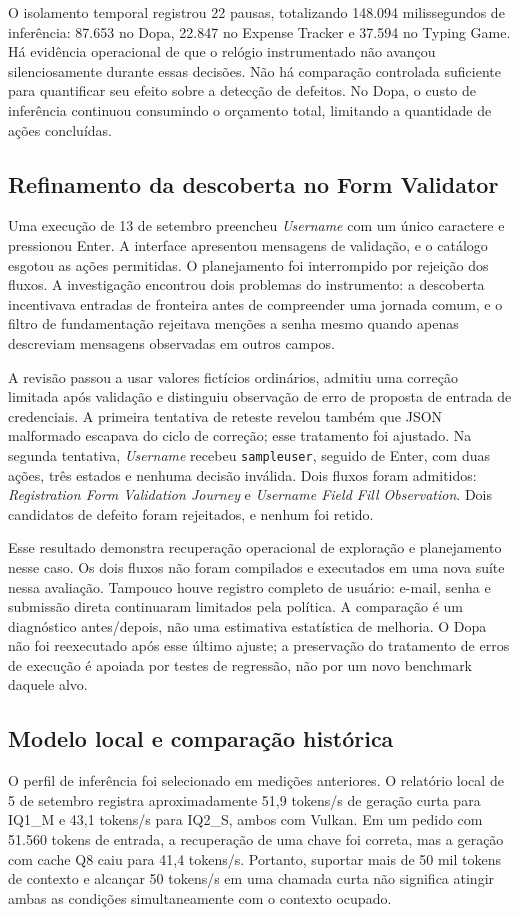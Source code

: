 \documentclass[12pt]{article}
\begin{document}
O isolamento temporal registrou 22 pausas, totalizando 148.094 milissegundos de inferência: 87.653 no Dopa, 22.847 no Expense Tracker e 37.594 no Typing Game. Há evidência operacional de que o relógio instrumentado não avançou silenciosamente durante essas decisões. Não há comparação controlada suficiente para quantificar seu efeito sobre a detecção de defeitos. No Dopa, o custo de inferência continuou consumindo o orçamento total, limitando a quantidade de ações concluídas.

\subsection{Refinamento da descoberta no Form Validator}
Uma execução de 13 de setembro preencheu \textit{Username} com um único caractere e pressionou Enter. A interface apresentou mensagens de validação, e o catálogo esgotou as ações permitidas. O planejamento foi interrompido por rejeição dos fluxos. A investigação encontrou dois problemas do instrumento: a descoberta incentivava entradas de fronteira antes de compreender uma jornada comum, e o filtro de fundamentação rejeitava menções a senha mesmo quando apenas descreviam mensagens observadas em outros campos.

A revisão passou a usar valores fictícios ordinários, admitiu uma correção limitada após validação e distinguiu observação de erro de proposta de entrada de credenciais. A primeira tentativa de reteste revelou também que JSON malformado escapava do ciclo de correção; esse tratamento foi ajustado. Na segunda tentativa, \textit{Username} recebeu \texttt{sampleuser}, seguido de Enter, com duas ações, três estados e nenhuma decisão inválida. Dois fluxos foram admitidos: \textit{Registration Form Validation Journey} e \textit{Username Field Fill Observation}. Dois candidatos de defeito foram rejeitados, e nenhum foi retido.

Esse resultado demonstra recuperação operacional de exploração e planejamento nesse caso. Os dois fluxos não foram compilados e executados em uma nova suíte nessa avaliação. Tampouco houve registro completo de usuário: e-mail, senha e submissão direta continuaram limitados pela política. A comparação é um diagnóstico antes/depois, não uma estimativa estatística de melhoria. O Dopa não foi reexecutado após esse último ajuste; a preservação do tratamento de erros de execução é apoiada por testes de regressão, não por um novo benchmark daquele alvo.

\subsection{Modelo local e comparação histórica}
O perfil de inferência foi selecionado em medições anteriores. O relatório local de 5 de setembro registra aproximadamente 51,9 tokens/s de geração curta para IQ1\_M e 43,1 tokens/s para IQ2\_S, ambos com Vulkan. Em um pedido com 51.560 tokens de entrada, a recuperação de uma chave foi correta, mas a geração com cache Q8 caiu para 41,4 tokens/s. Portanto, suportar mais de 50 mil tokens de contexto e alcançar 50 tokens/s em uma chamada curta não significa atingir ambas as condições simultaneamente com o contexto ocupado.
\end{document}
